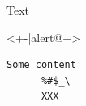 \documentclass{ltx-talk}
\begin{document}
\begin{frame*}
  Text
  \begin{actionenv}<+-|alert@+>
    \begin{Verbatim}[gobble = 6]
      Some content
      %#$_\
      XXX
    \end{Verbatim}
  \end{actionenv}
\end{frame*}
\end{document}
